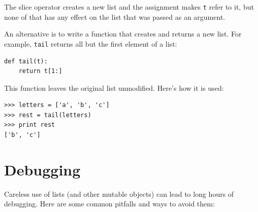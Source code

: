 \documentclass[10pt]{book}
\begin{document}
The slice operator creates a new list and the assignment
makes {\tt t} refer to it, but none of that has any effect
on the list that was passed as an argument.

An alternative is to write a function that creates and
returns a new list.  For
example, {\tt tail} returns all but the first
element of a list:

\begin{verbatim}
def tail(t):
    return t[1:]
\end{verbatim}
%
This function leaves the original list unmodified.
Here's how it is used:

\begin{verbatim}
>>> letters = ['a', 'b', 'c']
>>> rest = tail(letters)
>>> print rest
['b', 'c']
\end{verbatim}



\section{Debugging}

Careless use of lists (and other mutable objects)
can lead to long hours of debugging.  Here are some common
pitfalls and ways to avoid them:
\end{document}
